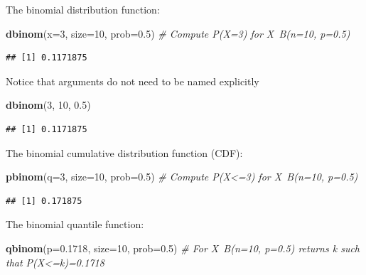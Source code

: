 \documentclass[]{book}
\newenvironment{Shaded}{\begin{snugshade}}{\end{snugshade}}
\newcommand{\KeywordTok}[1]{\textcolor[rgb]{0.13,0.29,0.53}{\textbf{{#1}}}}
\newcommand{\DataTypeTok}[1]{\textcolor[rgb]{0.13,0.29,0.53}{{#1}}}
\newcommand{\DecValTok}[1]{\textcolor[rgb]{0.00,0.00,0.81}{{#1}}}
\newcommand{\FloatTok}[1]{\textcolor[rgb]{0.00,0.00,0.81}{{#1}}}
\newcommand{\CommentTok}[1]{\textcolor[rgb]{0.56,0.35,0.01}{\textit{{#1}}}}
\newcommand{\NormalTok}[1]{{#1}}
\theoremstyle{definition}
\theoremstyle{definition}
\theoremstyle{remark}
\begin{document}
The binomial distribution function:

\begin{Shaded}
\begin{Highlighting}[]
\KeywordTok{dbinom}\NormalTok{(}\DataTypeTok{x=}\DecValTok{3}\NormalTok{, }\DataTypeTok{size=}\DecValTok{10}\NormalTok{, }\DataTypeTok{prob=}\FloatTok{0.5}\NormalTok{)  }\CommentTok{# Compute P(X=3) for X~B(n=10, p=0.5) }
\end{Highlighting}
\end{Shaded}

\begin{verbatim}
## [1] 0.1171875
\end{verbatim}

Notice that arguments do not need to be named explicitly

\begin{Shaded}
\begin{Highlighting}[]
\KeywordTok{dbinom}\NormalTok{(}\DecValTok{3}\NormalTok{, }\DecValTok{10}\NormalTok{, }\FloatTok{0.5}\NormalTok{)}
\end{Highlighting}
\end{Shaded}

\begin{verbatim}
## [1] 0.1171875
\end{verbatim}

The binomial cumulative distribution function (CDF):

\begin{Shaded}
\begin{Highlighting}[]
\KeywordTok{pbinom}\NormalTok{(}\DataTypeTok{q=}\DecValTok{3}\NormalTok{, }\DataTypeTok{size=}\DecValTok{10}\NormalTok{, }\DataTypeTok{prob=}\FloatTok{0.5}\NormalTok{) }\CommentTok{# Compute P(X<=3) for X~B(n=10, p=0.5)   }
\end{Highlighting}
\end{Shaded}

\begin{verbatim}
## [1] 0.171875
\end{verbatim}

The binomial quantile function:

\begin{Shaded}
\begin{Highlighting}[]
\KeywordTok{qbinom}\NormalTok{(}\DataTypeTok{p=}\FloatTok{0.1718}\NormalTok{, }\DataTypeTok{size=}\DecValTok{10}\NormalTok{, }\DataTypeTok{prob=}\FloatTok{0.5}\NormalTok{) }\CommentTok{# For X~B(n=10, p=0.5) returns k such that P(X<=k)=0.1718}
\end{Highlighting}
\end{Shaded}
\end{document}

